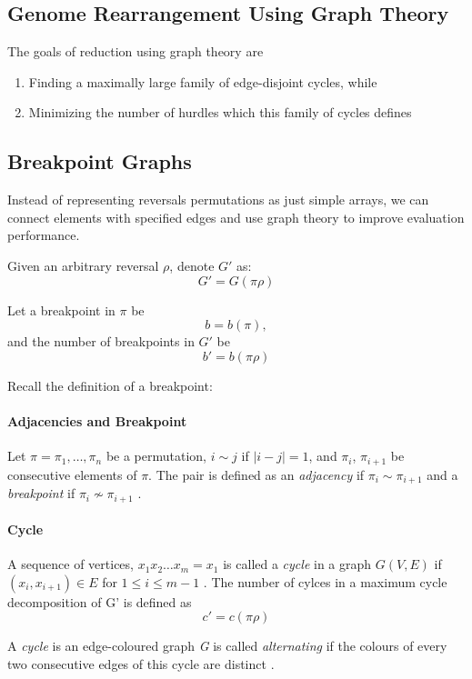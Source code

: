 \documentclass[10pt]{article}
\begin{document}
\subsection*{Genome Rearrangement Using Graph Theory}

The goals of reduction using graph theory are

\begin{enumerate}
  \item Finding a maximally large family of edge-disjoint cycles, while
  \item Minimizing the number of hurdles which this family of cycles defines
\end{enumerate}

\subsection*{Breakpoint Graphs}
Instead of representing reversals permutations as just simple arrays, we can
connect elements with specified edges and use graph theory to improve evaluation
performance. 

Given an arbitrary reversal $\rho$, denote $G'$ as: $$ G' = G(\pi\rho) $$

Let a breakpoint in $\pi$ be $$b = b(\pi),$$ and the number of breakpoints in
$G'$ be $$ b' = b(\pi\rho)$$

Recall the definition of a breakpoint:

\paragraph{Adjacencies and Breakpoint} Let $\pi = \pi_1,\ldots,\pi_n$ be a
permutation, $i \sim j$ if $|i - j| = 1$, and $\pi_i$, $\pi_{i+1}$ be
consecutive elements of $ \pi $. The pair is defined as an \emph{adjacency} if
$\pi_i \sim \pi_{i+1}$ and a \emph{breakpoint} if $\pi_i \not\sim \pi_{i+1}$
\cite{_genomerearrangements}.

\paragraph{Cycle} A sequence of vertices, $ x_1x_2\ldots x_m = x_1$ is called
a \emph{cycle} in a graph $G(V, E)$ if $(x_i, x_{i+1}) \in E$ for $1 \leq i
\leq m - 1$ \cite{_genomerearrangements}. The number of cylces in a maximum
cycle decomposition of G' is defined as $$c' = c(\pi\rho)$$

A \emph{cycle} is an edge-coloured graph \emph{G} is called \emph{alternating}
if the colours of every two consecutive edges of this cycle are distinct
\cite{_genomerearrangements}.
\end{document}
